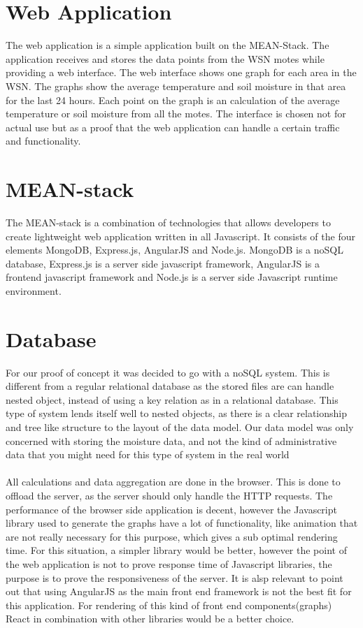 \documentclass[]{uiophd}
\begin{document}
\section{Web Application}
The web application is a simple application built on the MEAN-Stack. The application receives and stores the data points from the WSN motes while providing a web interface. The web interface shows one graph for each area in the WSN. The graphs show the average temperature and soil moisture in that area for the last 24 hours. Each point on the graph is an calculation of the average temperature or soil moisture from all the motes. The interface is chosen not for actual use but as a proof that the web application can handle a certain traffic and functionality. 

\section{MEAN-stack}
The MEAN-stack is a combination of technologies that allows developers to create lightweight web application written in all Javascript. It consists of the four elements MongoDB, Express.js, AngularJS and Node.js. MongoDB is a noSQL database, Express.js is a server side javascript framework, AngularJS is a frontend javascript framework and Node.js is a server side Javascript runtime environment. 

\section{Database}
For our proof of concept it was decided to go with a noSQL system. This is different from a regular relational database as the stored files are can handle nested object, instead of using a key relation as in a relational database. This type of system lends itself well to nested objects, as there is a clear relationship and tree like structure to the layout of the data model. Our data model was only concerned with storing the moisture data, and not the kind of administrative data that you might need for this type of system in the real world
\\\\
All calculations and data aggregation are done in the browser. This is done to offload the server, as the server should only handle the HTTP requests. The performance of the browser side application is decent, however the Javascript library used to generate the graphs have a lot of functionality, like animation that are not really necessary for this purpose, which gives a sub optimal rendering time. For this situation, a simpler library would be better, however the point of the web application is not to prove response time of Javascript libraries, the purpose is to prove the responsiveness of the server. It is alsp relevant to point out that using AngularJS as the main front end framework is not the best fit for this application. For rendering of this kind of front end components(graphs) React in combination with other libraries would be a better choice. 
\end{document}
